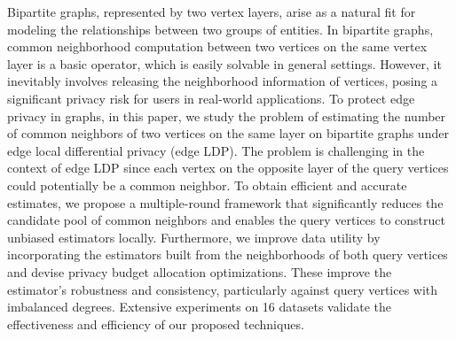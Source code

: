 Bipartite graphs, represented by two vertex layers, arise as a natural fit for modeling the relationships between two groups of entities. In bipartite graphs, common neighborhood computation between two vertices on the same vertex layer is a basic operator, which is easily solvable in general settings. However, it inevitably involves releasing the neighborhood information of vertices, posing a significant privacy risk for users in real-world applications. To protect edge privacy in graphs, in this paper, we study the problem of estimating the number of common neighbors of two vertices on the same layer on bipartite graphs under edge local differential privacy (edge LDP). The problem is challenging in the context of edge LDP since each vertex on the opposite layer of the query vertices could potentially be a common neighbor. To obtain efficient and accurate estimates, we propose a multiple-round framework that significantly reduces the candidate pool of common neighbors and enables the query vertices to construct unbiased estimators locally. Furthermore, we improve data utility by incorporating the estimators built from the neighborhoods of both query vertices and devise privacy budget allocation optimizations. These improve the estimator's robustness and consistency, particularly against query vertices with imbalanced degrees. Extensive experiments on 16 datasets validate the effectiveness and efficiency of our proposed techniques.